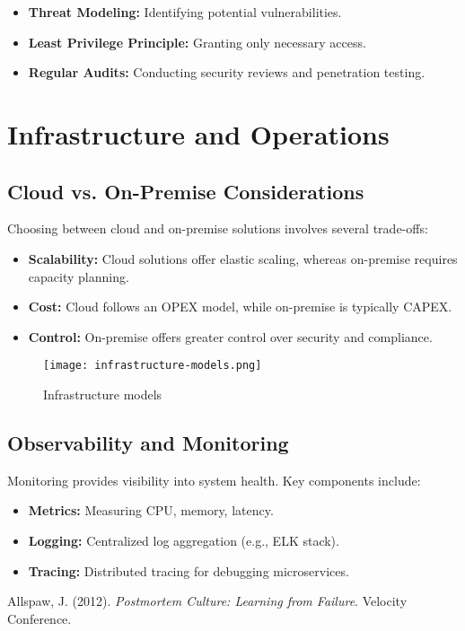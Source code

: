 \begin{itemize}
    \item \textbf{Threat Modeling:} Identifying potential vulnerabilities.
    \item \textbf{Least Privilege Principle:} Granting only necessary access.
    \item \textbf{Regular Audits:} Conducting security reviews and penetration testing.
\end{itemize}

\section{Infrastructure and Operations}

\subsection{Cloud vs. On-Premise Considerations}

Choosing between cloud and on-premise solutions involves several trade-offs:

\begin{itemize}
    \item \textbf{Scalability:} Cloud solutions offer elastic scaling, whereas on-premise requires capacity planning.
    \item \textbf{Cost:} Cloud follows an OPEX model, while on-premise is typically CAPEX.
    \item \textbf{Control:} On-premise offers greater control over security and compliance.
\end{itemize}

\begin{figure}[h]
    \centering
    \texttt{[image: infrastructure-models.png]}
    \caption{Infrastructure models}
\end{figure}

\subsection{Observability and Monitoring}

Monitoring provides visibility into system health. Key components include:

\begin{itemize}
    \item \textbf{Metrics:} Measuring CPU, memory, latency.
    \item \textbf{Logging:} Centralized log aggregation (e.g., ELK stack).
    \item \textbf{Tracing:} Distributed tracing for debugging microservices.
\end{itemize}



\begin{thebibliography}{9}
     Allspaw, J. (2012). \textit{Postmortem Culture: Learning from Failure}. Velocity Conference.
\end{thebibliography}

